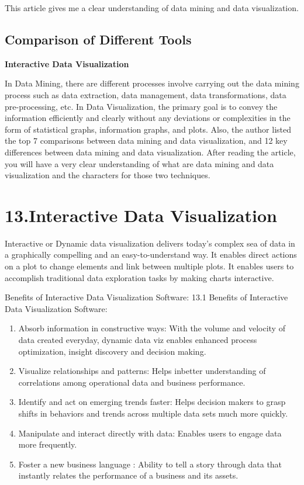 \documentclass[]{book}
\providecommand{\tightlist}{%
  \setlength{\itemsep}{0pt}\setlength{\parskip}{0pt}}
\theoremstyle{definition}
\theoremstyle{definition}
\theoremstyle{definition}
\theoremstyle{remark}
\begin{document}
This article gives me a clear understanding of data mining and data
visualization.

\subsection{Comparison of Different
Tools}\label{comparison-of-different-tools}

\textbf{Interactive Data Visualization}

In Data Mining, there are different processes involve carrying out the
data mining process such as data extraction, data management, data
transformations, data pre-processing, etc. In Data Visualization, the
primary goal is to convey the information efficiently and clearly
without any deviations or complexities in the form of statistical
graphs, information graphs, and plots. Also, the author listed the top 7
comparisons between data mining and data visualization, and 12 key
differences between data mining and data visualization. After reading
the article, you will have a very clear understanding of what are data
mining and data visualization and the characters for those two
techniques.

\section{13.Interactive Data
Visualization}\label{interactive-data-visualization}

Interactive or Dynamic data visualization delivers today's complex sea
of data in a graphically compelling and an easy-to-understand way. It
enables direct actions on a plot to change elements and link between
multiple plots. It enables users to accomplish traditional data
exploration tasks by making charts interactive.

Benefits of Interactive Data Visualization Software: 13.1 Benefits of
Interactive Data Visualization Software:

\begin{enumerate}
\def\labelenumi{\arabic{enumi}.}
\tightlist
\item
  Absorb information in constructive ways: With the volume and velocity
  of data created everyday, dynamic data viz enables enhanced process
  optimization, insight discovery and decision making.\\
\item
  Visualize relationships and patterns: Helps inbetter understanding of
  correlations among operational data and business performance.\\
\item
  Identify and act on emerging trends faster: Helps decision makers to
  grasp shifts in behaviors and trends across multiple data sets much
  more quickly.\\
\item
  Manipulate and interact directly with data: Enables users to engage
  data more frequently.\\
\item
  Foster a new business language : Ability to tell a story through data
  that instantly relates the performance of a business and its assets.
\end{enumerate}
\end{document}
